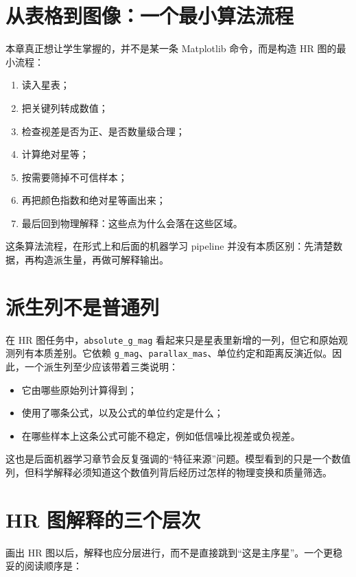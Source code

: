 \section{从表格到图像：一个最小算法流程}

本章真正想让学生掌握的，并不是某一条 Matplotlib 命令，而是构造 HR 图的最小流程：

\begin{enumerate}
    \item 读入星表；
    \item 把关键列转成数值；
    \item 检查视差是否为正、是否数量级合理；
    \item 计算绝对星等；
    \item 按需要筛掉不可信样本；
    \item 再把颜色指数和绝对星等画出来；
    \item 最后回到物理解释：这些点为什么会落在这些区域。
\end{enumerate}

这条算法流程，在形式上和后面的机器学习 pipeline 并没有本质区别：先清楚数据，再构造派生量，再做可解释输出。

\section{派生列不是普通列}

在 HR 图任务中，\texttt{absolute\_g\_mag} 看起来只是星表里新增的一列，但它和原始观测列有本质差别。它依赖 \texttt{g\_mag}、\texttt{parallax\_mas}、单位约定和距离反演近似。因此，一个派生列至少应该带着三类说明：

\begin{itemize}
    \item 它由哪些原始列计算得到；
    \item 使用了哪条公式，以及公式的单位约定是什么；
    \item 在哪些样本上这条公式可能不稳定，例如低信噪比视差或负视差。
\end{itemize}

这也是后面机器学习章节会反复强调的“特征来源”问题。模型看到的只是一个数值列，但科学解释必须知道这个数值列背后经历过怎样的物理变换和质量筛选。

\section{HR 图解释的三个层次}

画出 HR 图以后，解释也应分层进行，而不是直接跳到“这是主序星”。一个更稳妥的阅读顺序是：

